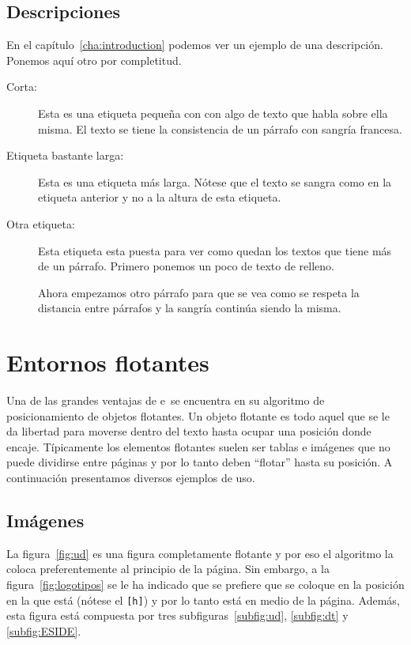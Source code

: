 \documentclass{DeustoFDP}
\begin{document}
\subsection{Descripciones}

En el cap\'itulo~\ref{cha:introduction} podemos ver un ejemplo de una
descripci\'on. Ponemos aqu\'i otro por completitud.
\begin{description}
  \item[Corta:] Esta es una etiqueta peque\~na con con algo de texto que habla
    sobre ella misma. El texto se tiene la consistencia de un p\'arrafo con
    sangr\'ia francesa.
  \item[Etiqueta bastante larga:] Esta es una etiqueta m\'as larga. N\'otese
    que el texto se sangra como en la etiqueta anterior y no a la altura
    de esta etiqueta.
  \item[Otra etiqueta:] Esta etiqueta esta puesta para ver como quedan los
    textos que tiene m\'as de un p\'arrafo. Primero ponemos un poco de texto
    de relleno.

    Ahora empezamos otro p\'arrafo para que se vea como se respeta la distancia
    entre p\'arrafos y la sangr\'ia contin\'ua siendo la misma.
\end{description}

\section{Entornos flotantes}

Una de las grandes ventajas de e\ se encuentra en su algoritmo de
posicionamiento de objetos flotantes. Un objeto flotante es todo aquel que se
le da libertad para moverse dentro del texto hasta ocupar una posici\'on donde
encaje. T\'ipicamente los elementos flotantes suelen ser tablas e im\'agenes
que no puede dividirse entre p\'aginas y por lo tanto deben \enquote{flotar}
hasta su posici\'on. A continuaci\'on presentamos diversos ejemplos de uso.

\subsection{Im\'agenes}

La figura~\ref{fig:ud} es una figura completamente flotante y por eso el
algoritmo la coloca preferentemente al principio de la p\'agina. Sin embargo,
a la figura~\ref{fig:logotipos} se le ha indicado que se prefiere que se coloque
en la posici\'on en la que est\'a (n\'otese el \texttt{[h]}) y por lo tanto
est\'a en medio de la p\'agina. Adem\'as, esta figura est\'a compuesta
por tres subfiguras~\ref{subfig:ud}, \ref{subfig:dt} y \ref{subfig:ESIDE}.
\end{document}
